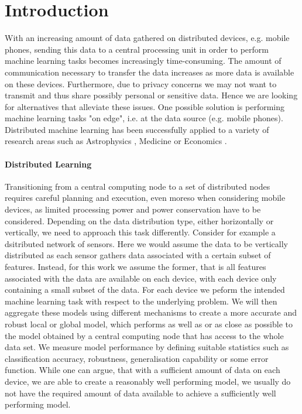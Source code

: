    
  \section{Introduction}
  With an increasing amount of data gathered on distributed devices, e.g. mobile phones, sending this data to a central processing unit in order to perform machine learning tasks becomes increasingly time-consuming.
  The amount of communication necessary to transfer the data increases as more data is available on these devices.
  Furthermore, due to privacy concerns we may not want to transmit and thus share possibly personal or sensitive data.
  Hence we are looking for alternatives that alleviate these issues.
  One possible solution is performing machine learning tasks "on edge", i.e. at the data source (e.g. mobile phones).
  Distributed machine learning has been successfully applied to a variety of research areas such as Astrophysics \cite{panousopoulou2017distributed}, Medicine \cite{deist2017infrastructure} or Economics \cite{kreitlein2015green}.

  \paragraph{Distributed Learning}

  Transitioning from a central computing node to a set of distributed nodes requires careful planning and execution, even moreso when considering mobile devices, as limited processing power and power conservation have to be considered.
  Depending on the data distribution type, either horizontally or vertically, we need to approach this task differently. 
  Consider for example a dsitributed network of sensors.
  Here we would assume the data to be vertically distributed as each sensor gathers data associated with a certain subset of features.
  Instead, for this work we assume the former, that is all features associated with the data are available on each device, with each device only containing a small subset of the data.
  For each device we peform the intended machine learning task with respect to the underlying problem.
  We will then aggregate these models using different mechanisms to create a more accurate and robust local or global model, which performs as well as or as close as possible to the model obtained by a central computing node that has access to the whole data set.
  We measure model performance by defining suitable statistics such as classification accuracy, robustness, generalisation capability or some error function.
  While one can argue, that with a sufficient amount of data on each device, we are able to create a reasonably well performing model, we usually do not have the required amount of data available to achieve a sufficiently well performing model.
    
